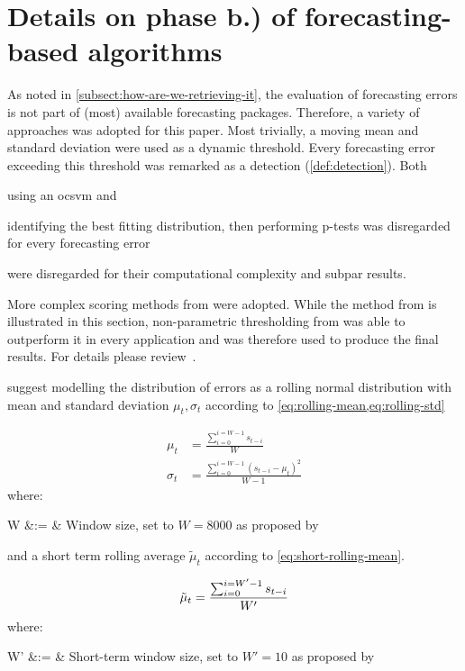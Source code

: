 \section{Details on phase b.) of forecasting-based algorithms}\label{sec:forecasting-eval}
As noted in \cref{subsect:how-are-we-retrieving-it}, the evaluation of forecasting
errors is not part of (most) available forecasting packages. Therefore, a variety
of approaches was adopted for this paper. Most trivially, a moving mean and standard
deviation were used as a dynamic threshold. Every forecasting error exceeding this
threshold was remarked as a detection (\cref{def:detection}). Both 
\begin{enumerate*}
    \item using an \gls{ocsvm} and 
    \item identifying the best fitting distribution, then performing p-tests was
    disregarded for every forecasting error
\end{enumerate*}
were disregarded for their computational complexity and subpar results.

More complex scoring methods from \cite{Ahmad.2017,Hundman.2018} were adopted.
While the method from \textcite{Ahmad.2017} is illustrated in this section,
non-parametric thresholding from \textcite{Hundman.2018} was able to outperform
it in every application and was therefore used to produce the final results.
For details please review~\cite{Hundman.2018}.

\textcite{Ahmad.2017} suggest modelling the distribution of errors as a rolling normal
distribution with mean and standard deviation \(\mu_t, \sigma_t\) according to
\cref{eq:rolling-mean,eq:rolling-std}

\begin{align}
    \mu_t&= \frac{\sum_{i=0}^{i=W-1}s_{t-i}}{W}\label{eq:rolling-mean}\\
    \sigma_t &= \frac{\sum_{i=0}^{i=W-1}{(s_{t-i}-\mu_t)}^2}{W - 1}\label{eq:rolling-std}
\end{align}
where:
\begin{conditions}
    W &:= & Window size, set to \(W=8000\) as proposed by~\cite{Ahmad.2017}
\end{conditions}

and a short term rolling average \(\tilde{\mu}_t\) according to \cref{eq:short-rolling-mean}.

\begin{equation}
    \tilde{\mu}_t = \frac{\sum_{i=0}^{i=W'-1}s_{t-i}}{W'}\label{eq:short-rolling-mean}\\
\end{equation}
where:
\begin{conditions}
    W' &:= & Short-term window size, set to \(W'=10\) as proposed by~\cite{Ahmad.2017}
\end{conditions}

